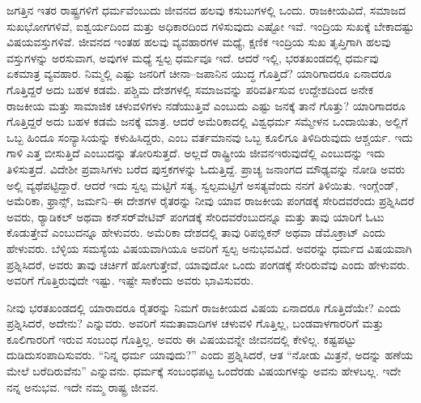 ಜಗತ್ತಿನ ಇತರ ರಾಷ್ಟ್ರಗಳಿಗೆ ಧರ್ಮವೆಂಬುದು ಜೀವನದ ಹಲವು ಕಸುಬುಗಳಲ್ಲಿ ಒಂದು. ರಾಜಕೀಯವಿದೆ, ಸಮಾಜದ ಸುಖಭೋಗಗಳಿವೆ, ಐಶ್ವರ್ಯದಿಂದ ಮತ್ತು ಅಧಿಕಾರದಿಂದ ಗಳಿಸುವುದು ಎಷ್ಟೋ ಇವೆ. ಇಂದ್ರಿಯ ಸುಖಕ್ಕೆ ಬೇಕಾದಷ್ಟು ವಿಷಯವಸ್ತುಗಳಿವೆ. ಜೀವನದ ಇಂತಹ ಹಲವು ವ್ಯವಹಾರಗಳ ಮಧ್ಯೆ, ಕ್ಷಣಿಕ ಇಂದ್ರಿಯ ಸುಖ ತೃಪ್ತಿಗಾಗಿ ಹಲವು ವಸ್ತುಗಳನ್ನು ಅರಸುವಾಗ, ಅವುಗಳ ಮಧ್ಯೆ ಸ್ವಲ್ಪ ಧರ್ಮವೂ ಇದೆ. ಆದರೆ ಇಲ್ಲಿ, ಭರತಖಂಡದಲ್ಲಿ ಧರ್ಮವು ಏಕಮಾತ್ರ ವ್ಯವಹಾರ. ನಿಮ್ಮಲ್ಲಿ ಎಷ್ಟು ಜನರಿಗೆ ಚೀನಾ–ಜಪಾನಿನ ಯುದ್ಧ ಗೊತ್ತಿದೆ? ಯಾರಿಗಾದರೂ ಏನಾದರೂ ಗೊತ್ತಿದ್ದರೆ ಅದು ಬಹಳ ಕಡಮೆ. ಪಶ್ಚಿಮ ದೇಶಗಳಲ್ಲಿ ಸಮಾಜವನ್ನು ಪರಿವರ್ತಿಸುವ ಉದ್ದೇಶದಿಂದ ಅನೇಕ ರಾಜಕೀಯ ಮತ್ತು ಸಾಮಾಜಿಕ ಚಳುವಳಿಗಳು ನಡೆಯುತ್ತಿವೆ ಎಂಬುದು ಎಷ್ಟು ಜನಕ್ಕೆ ತಾನೆ ಗೊತ್ತು? ಯಾರಿಗಾದರೂ ಗೊತ್ತಿದ್ದರೆ ಅದು ಬಹಳ ಕಡಮೆ ಜನಕ್ಕೆ ಮಾತ್ರ. ಆದರೆ ಅಮೆರಿಕಾದಲ್ಲಿ ವಿಶ್ವಧರ್ಮ ಸಮ್ಮೇಳನ ಒಂದಾಯಿತು, ಅಲ್ಲಿಗೆ ಒಬ್ಬ ಹಿಂದೂ ಸಂನ್ಯಾಸಿಯನ್ನು ಕಳುಹಿಸಿದ್ದರು, ಎಂಬ ವರ್ತಮಾನವು ಒಬ್ಬ ಕೂಲಿಗೂ ತಿಳಿದಿರುವುದು ಆಶ್ಚರ್ಯ. ಇದು ಗಾಳಿ ಎತ್ತ ಬೀಸುತ್ತಿದೆ ಎಂಬುದನ್ನು ತೋರಿಸುತ್ತದೆ. ಅಲ್ಲದೆ ರಾಷ್ಟ್ರೀಯ ಜೀವನ\break ಇರುವುದೆಲ್ಲಿ ಎಂಬುದನ್ನು ಇದು ತಿಳಿಸುತ್ತದೆ. ವಿದೇಶೀ ಪ್ರವಾಸಿಗಳು ಬರೆದ ಪುಸ್ತಕಗಳನ್ನು ಓದುತ್ತಿದ್ದೆ. ಪ್ರಾಚ್ಯ ಜನಾಂಗದ ಮೌಢ್ಯವನ್ನು ನೋಡಿ ಅವರು ಅಲ್ಲಿ ವ್ಯಥೆಪಟ್ಟಿದ್ದಾರೆ. ಆದರೆ ಇದು ಸ್ವಲ್ಪ ಮಟ್ಟಿಗೆ ಸತ್ಯ, ಸ್ವಲ್ಪಮಟ್ಟಿಗೆ ಅಸತ್ಯವೆಂದು ನನಗೆ ತಿಳಿಯಿತು. ಇಂಗ್ಲೆಂಡ್​, ಅಮೆರಿಕಾ, ಫ್ರಾನ್ಸ್, ಜರ್ಮನಿ–ಈ ದೇಶಗಳ ರೈತರನ್ನು ನೀವು ಯಾವ ರಾಜಕೀಯ ಪಂಗಡಕ್ಕೆ ಸೇರಿದವರೆಂದು ಪ್ರಶ್ನಿಸಿದರೆ ಅವರು, ರ‌್ಯಾಡಿಕಲ್​ ಅಥವಾ ಕನ್​ಸರ್​ವೇಟಿವ್​ ಪಂಗಡಕ್ಕೆ ಸೇರಿದವರೆಂಬುದನ್ನೂ ಮತ್ತು ತಾವು ಯಾರಿಗೆ ಓಟು ಕೊಡುತ್ತೇವೆ ಎಂಬುದನ್ನೂ ಹೇಳುವರು. ಅಮೆರಿಕಾ ದೇಶದಲ್ಲಿ ತಾವು ರಿಪಬ್ಲಿಕನ್​ ಅಥವಾ ಡೆಮೊಕ್ರಾಟ್​ ಎಂದು ಹೇಳುವರು. ಬೆಳ್ಳಿಯ ಸಮಸ್ಯೆಯ ವಿಷಯವಾಗಿಯೂ ಅವರಿಗೆ ಸ್ವಲ್ಪ ಅನುಭವವಿದೆ. ಅವರನ್ನು ಧರ್ಮದ ವಿಷಯವಾಗಿ ಪ್ರಶ್ನಿಸಿದರೆ, ಅವರು ತಾವು ಚರ್ಚಿಗೆ ಹೋಗುತ್ತೇವೆ, ಯಾವುದೋ ಒಂದು ಪಂಗಡಕ್ಕೆ ಸೇರಿರುವೆವು ಎಂದು ಹೇಳುವರು. ಅವರಿಗೆ ಗೊತ್ತಿರುವುದೇ ಇಷ್ಟು. ಇಷ್ಟೇ ಸಾಕೆಂದು ಅವರು ಭಾವಿಸುವರು.

ನೀವು ಭರತಖಂಡದಲ್ಲಿ ಯಾರಾದರೂ ರೈತರನ್ನು ನಿಮಗೆ ರಾಜಕೀಯದ ವಿಷಯ ಏನಾದರೂ ಗೊತ್ತಿದೆಯೇ? ಎಂದು ಪ್ರಶ್ನಿಸಿದರೆ, ಅದೇನು? ಎನ್ನುವರು. ಅವರಿಗೆ ಸಮತಾವಾದಿಗಳ ಚಳುವಳಿ ಗೊತ್ತಿಲ್ಲ, ಬಂಡವಾಳಗಾರರಿಗೆ ಮತ್ತು ಕೂಲಿಗಾರರಿಗೆ ಇರುವ ಸಂಬಂಧ ಗೊತ್ತಿಲ್ಲ. ಅವರು ಈ ವಿಷಯವನ್ನೇ ಜೀವನದಲ್ಲಿ ಕೇಳಿಲ್ಲ. ಕಷ್ಟಪಟ್ಟು ದುಡಿದು\break ಸಂಪಾದಿಸುವರು. “ನಿನ್ನ ಧರ್ಮ ಯಾವುದು?” ಎಂದು ಪ್ರಶ್ನಿಸಿದರೆ, ಆತ “ನೋಡು ಮಿತ್ರನೆ, ಅದನ್ನು ಹಣೆಯ ಮೇಲೆ ಬರೆದಿರುವೆನು” ಎನ್ನುವನು. ಧರ್ಮಕ್ಕೆ ಸಂಬಂಧಪಟ್ಟ ಒಂದೆರಡು ವಿಷಯಗಳನ್ನು ಅವನು ಹೇಳಬಲ್ಲ. ಇದೇ ನನ್ನ ಅನುಭವ. ಇದೇ ನಮ್ಮ ರಾಷ್ಟ್ರ ಜೀವನ.

